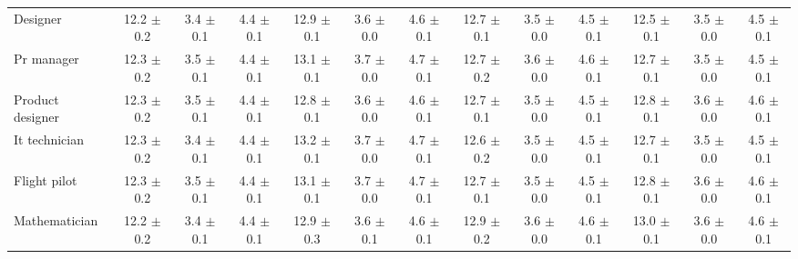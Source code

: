 \begin{table*}[p]
{\begin{tabular}{l|ccc|ccc|ccc|ccc}
Designer
& 12.2 $\pm$ 0.2 & 3.4 $\pm$ 0.1 & 4.4 $\pm$ 0.1 & 12.9 $\pm$ 0.1 & 3.6 $\pm$ 0.0 & 4.6 $\pm$ 0.1 & 12.7 $\pm$ 0.1 & 3.5 $\pm$ 0.0 & 4.5 $\pm$ 0.1 & 12.5 $\pm$ 0.1 & 3.5 $\pm$ 0.0 & 4.5 $\pm$ 0.1 \\
Pr manager
& 12.3 $\pm$ 0.2 & 3.5 $\pm$ 0.1 & 4.4 $\pm$ 0.1 & 13.1 $\pm$ 0.1 & 3.7 $\pm$ 0.0 & 4.7 $\pm$ 0.1 & 12.7 $\pm$ 0.2 & 3.6 $\pm$ 0.0 & 4.6 $\pm$ 0.1 & 12.7 $\pm$ 0.1 & 3.5 $\pm$ 0.0 & 4.5 $\pm$ 0.1 \\
Product designer
& 12.3 $\pm$ 0.2 & 3.5 $\pm$ 0.1 & 4.4 $\pm$ 0.1 & 12.8 $\pm$ 0.1 & 3.6 $\pm$ 0.0 & 4.6 $\pm$ 0.1 & 12.7 $\pm$ 0.1 & 3.5 $\pm$ 0.0 & 4.5 $\pm$ 0.1 & 12.8 $\pm$ 0.1 & 3.6 $\pm$ 0.0 & 4.6 $\pm$ 0.1 \\
It technician
& 12.3 $\pm$ 0.2 & 3.4 $\pm$ 0.1 & 4.4 $\pm$ 0.1 & 13.2 $\pm$ 0.1 & 3.7 $\pm$ 0.0 & 4.7 $\pm$ 0.1 & 12.6 $\pm$ 0.2 & 3.5 $\pm$ 0.0 & 4.5 $\pm$ 0.1 & 12.7 $\pm$ 0.1 & 3.5 $\pm$ 0.0 & 4.5 $\pm$ 0.1 \\
Flight pilot
& 12.3 $\pm$ 0.2 & 3.5 $\pm$ 0.1 & 4.4 $\pm$ 0.1 & 13.1 $\pm$ 0.1 & 3.7 $\pm$ 0.0 & 4.7 $\pm$ 0.1 & 12.7 $\pm$ 0.1 & 3.5 $\pm$ 0.0 & 4.5 $\pm$ 0.1 & 12.8 $\pm$ 0.1 & 3.6 $\pm$ 0.0 & 4.6 $\pm$ 0.1 \\
Mathematician
& 12.2 $\pm$ 0.2 & 3.4 $\pm$ 0.1 & 4.4 $\pm$ 0.1 & 12.9 $\pm$ 0.3 & 3.6 $\pm$ 0.1 & 4.6 $\pm$ 0.1 & 12.9 $\pm$ 0.2 & 3.6 $\pm$ 0.0 & 4.6 $\pm$ 0.1 & 13.0 $\pm$ 0.1 & 3.6 $\pm$ 0.0 & 4.6 $\pm$ 0.1 \\



\bottomrule
\end{tabular}
}
\label{appendix:results-speaking-rate-part1}
\end{table*}